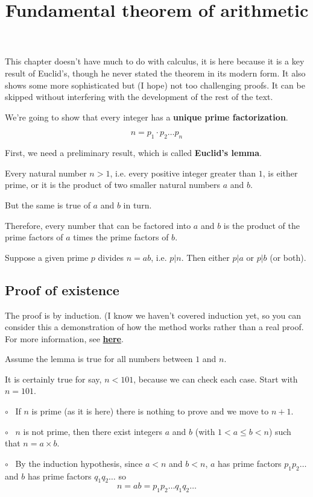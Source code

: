 \documentclass[11pt, oneside]{article}
\title{Fundamental theorem of arithmetic}
\date{}
\begin{document}
\maketitle
\Large

This chapter doesn't have much to do with calculus, it is here because it is a key result of Euclid's, though he never stated the theorem in its modern form.  It also shows some more sophisticated but (I hope) not too challenging proofs.  It can be skipped without interfering with the development of the rest of the text.

We're going to show that every integer has a \textbf{unique prime factorization}.

\[ n = p_1 \cdot p_2 \dots p_n \]

First, we need a preliminary result, which is called \textbf{Euclid's lemma}.

Every natural number $n > 1$, i.e. every positive integer greater than $1$, is either prime, or it is the product of two smaller natural numbers $a$ and $b$.

But the same is true of $a$ and $b$ in turn.

Therefore, every number that can be factored into $a$ and $b$ is the product of the prime factors of $a$ times the prime factors of $b$.  

Suppose a given prime $p$ divides $n = ab$, i.e. $p|n$. Then either $p|a$ or  $p|b$ (or both).

\subsection*{Proof of existence}

The proof is by induction.  (I know we haven't covered induction yet, so you can consider this a demonstration of how the method works rather than a real proof.   For more information, see \hyperref[sec:induction]{\textbf{here}}.

Assume the lemma is true for all numbers between $1$ and $n$.  

It is certainly true for say, $n < 101$, because we can check each case.  Start with $n = 101$.

$\circ$ \ If $n$ is prime (as it is here) there is nothing to prove and we move to $n + 1$.  

$\circ$ \  $n$ is not prime, then there exist integers $a$ and $b$ (with $1 < a \le b < n$) such that $n = a \times b$.

$\circ$ \ By the induction hypothesis, since $a < n$ and $b < n$, $a$ has prime factors $p_1 p_2 \dots$ and $b$ has prime factors $q_1 q_2 \dots$ so
\[ n = ab = p_1 p_2 \dots q_1 q_2 \dots \]
\end{document}
